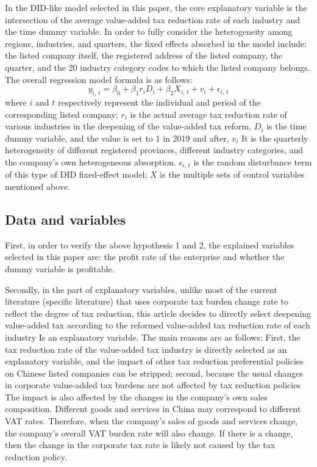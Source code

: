 \documentclass[3p,times]{elsarticle}
\begin{document}
In the DID-like model selected in this paper, the core explanatory variable is the intersection of the average value-added tax reduction rate of each industry and the time dummy variable. In order to fully consider the heterogeneity among regions, industries, and quarters, the fixed effects absorbed in the model include: the listed company itself, the registered address of the listed company, the quarter, and the 20 industry category codes to which the listed company belongs. The overall regression model formula is as follows:
\begin{equation}
    y_{i,\,t} = \beta_0 + \beta_1 r_i D_i + \beta_2 X_{i,\,t} + v_i + \epsilon_{i,\,t}
\end{equation}
where $i$ and $t$ respectively represent the individual and period of the corresponding listed company; $r_i$ is the actual average tax reduction rate of various industries in the deepening of the value-added tax reform, $D_i$ is the time dummy variable, and the value is set to 1 in 2019 and after, $v_i$ It is the quarterly heterogeneity of different registered provinces, different industry categories, and the company's own heterogeneous absorption. $\epsilon_{i,\,t}$ is the random disturbance term of this type of DID fixed-effect model; $X$ is the multiple sets of control variables mentioned above.

\subsection{Data and variables}
First, in order to verify the above hypothesis 1 and 2, the explained variables selected in this paper are: the profit rate of the enterprise and whether the dummy variable is profitable.

Secondly, in the part of explanatory variables, unlike most of the current literature (specific literature) that uses corporate tax burden change rate to reflect the degree of tax reduction, this article decides to directly select deepening value-added tax according to the reformed value-added tax reduction rate of each industry Is an explanatory variable. The main reasons are as follows: First, the tax reduction rate of the value-added tax industry is directly selected as an explanatory variable, and the impact of other tax reduction preferential policies on Chinese listed companies can be stripped; second, because the usual changes in corporate value-added tax burdens are not affected by tax reduction policies The impact is also affected by the changes in the company’s own sales composition. Different goods and services in China may correspond to different VAT rates. Therefore, when the company’s sales of goods and services change, the company’s overall VAT burden rate will also change. If there is a change, then the change in the corporate tax rate is likely not caused by the tax reduction policy. 
\end{document}

